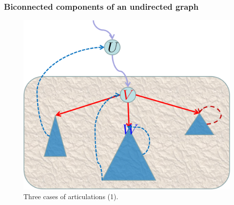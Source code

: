 \begin{frame}
  \frametitle{Biconnected components of an undirected graph}
  
  \begin{figure}
    \begin{center}
      \includegraphics[scale=0.40]{figure/bfs_dfs/bicon1}
      \caption{{\scriptsize Three cases of articulations (1).}}
      \label{fig:bicon1}
    \end{center}
  \end{figure}  
  
\end{frame}


